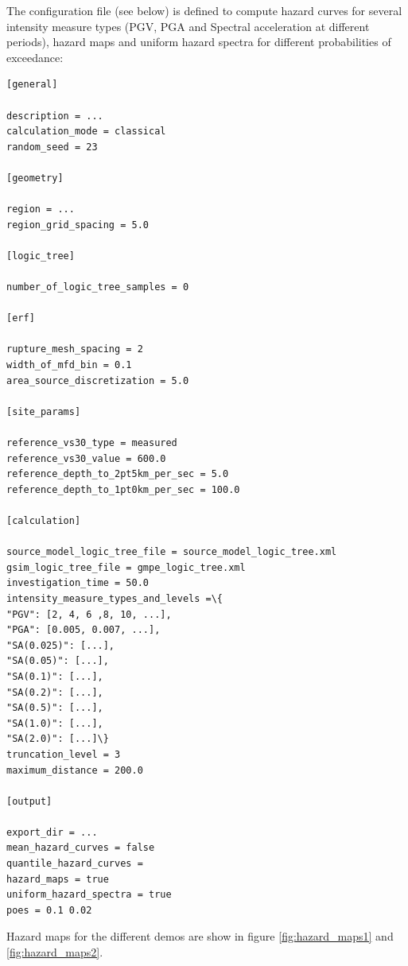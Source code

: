The configuration file (see below) is defined to compute hazard 
curves for several intensity measure types (PGV, PGA and Spectral
acceleration at different periods), hazard maps and uniform hazard 
spectra for different probabilities of exceedance:
\begin{Verbatim}[frame=single, commandchars=\\\{\}, fontsize=\normalsize]
[general]

description = ...
calculation_mode = classical
random_seed = 23

[geometry]

region = ...
region_grid_spacing = 5.0

[logic_tree]

number_of_logic_tree_samples = 0

[erf]

rupture_mesh_spacing = 2
width_of_mfd_bin = 0.1
area_source_discretization = 5.0

[site_params]

reference_vs30_type = measured
reference_vs30_value = 600.0
reference_depth_to_2pt5km_per_sec = 5.0
reference_depth_to_1pt0km_per_sec = 100.0

[calculation]

source_model_logic_tree_file = source_model_logic_tree.xml
gsim_logic_tree_file = gmpe_logic_tree.xml
investigation_time = 50.0
intensity_measure_types_and_levels =\{
"PGV": [2, 4, 6 ,8, 10, ...], 
"PGA": [0.005, 0.007, ...], 
"SA(0.025)": [...], 
"SA(0.05)": [...],
"SA(0.1)": [...], 
"SA(0.2)": [...], 
"SA(0.5)": [...], 
"SA(1.0)": [...],
"SA(2.0)": [...]\}
truncation_level = 3
maximum_distance = 200.0

[output]

export_dir = ...
mean_hazard_curves = false
quantile_hazard_curves =
hazard_maps = true
uniform_hazard_spectra = true
poes = 0.1 0.02
\end{Verbatim}
Hazard maps for the different demos are show in figure 
\ref{fig:hazard_maps1} and \ref{fig:hazard_maps2}.

